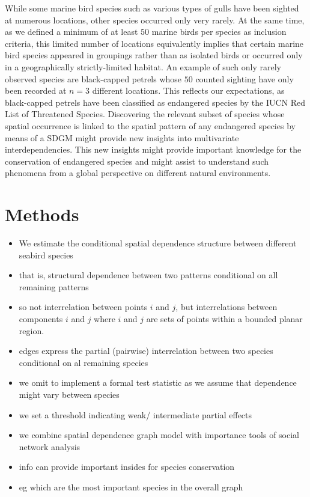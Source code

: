 \documentclass{statsoc}
\begin{document}
While some marine bird species such as various types of gulls have been sighted at numerous locations, other species occurred only very rarely. At the same time, as we defined a minimum of at least $50$ marine birds per species as inclusion criteria, this limited number of locations equivalently implies that certain marine bird species appeared in groupings rather than as isolated birds or occurred only in a geographically strictly-limited habitat. An example of such only rarely observed species are black-capped petrels whose $50$ counted sighting have only been recorded at $n=3$ different locations. This reflects our expectations, as black-capped petrels have been classified as endangered species by the IUCN Red List of Threatened Species. Discovering the relevant subset of species whose spatial occurrence is linked to the spatial pattern of any endangered species  by means of a SDGM might provide new insights into multivariate interdependencies.  This new insights might provide important knowledge for the conservation of endangered species and might assist to understand such phenomena from a global perspective on different natural environments.    



\section{Methods}
\begin{itemize}
\item We estimate the conditional spatial dependence structure between different seabird species
\item that is, structural dependence between two patterns conditional on all remaining patterns
\item so not interrelation between points $i$ and $j$, but interrelations between components $i$ and $j$ where $i$ and $j$ are sets of points within a bounded planar region.
\item edges express the partial (pairwise) interrelation between two species conditional on al remaining species
\item we omit to implement a formal test statistic as we assume that dependence might vary between species
\item we set a threshold indicating weak/ intermediate partial effects
\item we combine spatial dependence graph model with importance tools of social network analysis
\item info can provide important insides for species conservation
\item eg which are the most important species in the overall graph
\end{itemize}
\end{document}
